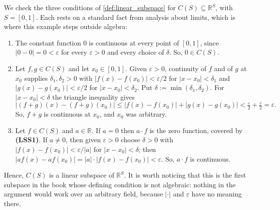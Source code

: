 \begin{exercisesolution}
\label{sol:continuous_subspace}
We check the three conditions of \cref{def:linear_subspace} for $C(S) \subseteq \mathbb{R}^S$, with $S = [0,1]$. Each rests on a standard fact from analysis about limits, which is where this example steps outside algebra:
\begin{enumerate}[label=\textbf{(LSS\arabic*)}]
    \item The constant function $0$ is continuous at every point of $[0,1]$, since $|0 - 0| = 0 < \varepsilon$ for every $\varepsilon > 0$ and every choice of $\delta$. So, $0 \in C(S)$.

    \item Let $f, g \in C(S)$ and let $x_0 \in [0,1]$. Given $\varepsilon > 0$, continuity of $f$ and of $g$ at $x_0$ supplies $\delta_1, \delta_2 > 0$ with $|f(x) - f(x_0)| < \varepsilon/2$ for $|x - x_0| < \delta_1$ and $|g(x) - g(x_0)| < \varepsilon/2$ for $|x - x_0| < \delta_2$. Put $\delta := \min(\delta_1, \delta_2)$. For $|x - x_0| < \delta$ the triangle inequality gives
    \[
        \bigl|(f+g)(x) - (f+g)(x_0)\bigr| \le |f(x) - f(x_0)| + |g(x) - g(x_0)| < \tfrac{\varepsilon}{2} + \tfrac{\varepsilon}{2} = \varepsilon .
    \]
    So, $f + g$ is continuous at $x_0$, and $x_0$ was arbitrary.

    \item Let $f \in C(S)$ and $a \in \mathbb{R}$. If $a = 0$ then $a \cdot f$ is the zero function, covered by \textbf{(LSS1)}. If $a \neq 0$, then given $\varepsilon > 0$ choose $\delta > 0$ with $|f(x) - f(x_0)| < \varepsilon / |a|$ for $|x - x_0| < \delta$; then $|a f(x) - a f(x_0)| = |a| \cdot |f(x) - f(x_0)| < \varepsilon$. So, $a \cdot f$ is continuous.
\end{enumerate}

Hence, $C(S)$ is a linear subspace of $\mathbb{R}^S$. It is worth noticing that this is the first subspace in the book whose defining condition is not algebraic: nothing in the argument would work over an arbitrary field, because $|\cdot|$ and $\varepsilon$ have no meaning there.
\end{exercisesolution}

